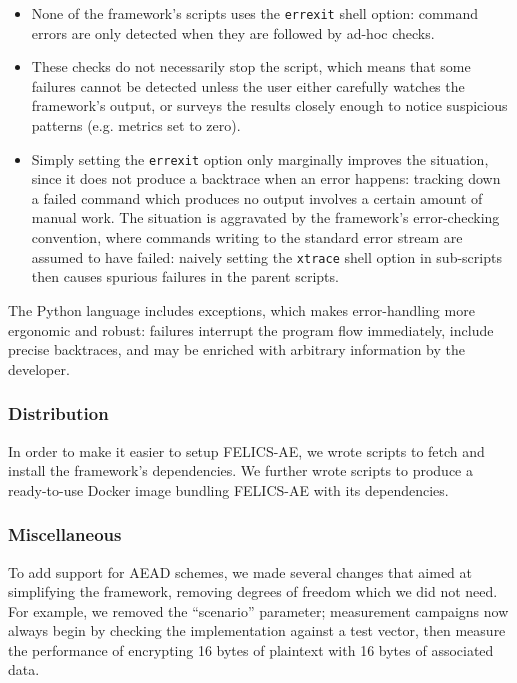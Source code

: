 \documentclass{article}
\begin{document}
\begin{itemize}
\item None of the framework's scripts uses the \texttt{errexit} shell
  option: command errors are only detected when they are followed by
  ad-hoc checks.
\item These checks do not necessarily stop the script, which means
  that some failures cannot be detected unless the user either
  carefully watches the framework's output, or surveys the results
  closely enough to notice suspicious patterns (e.g. metrics set to
  zero).
\item Simply setting the \texttt{errexit} option only marginally
  improves the situation, since it does not produce a backtrace when
  an error happens: tracking down a failed command which produces no
  output involves a certain amount of manual work.  The situation is
  aggravated by the framework's error-checking convention, where
  commands writing to the standard error stream are assumed to have
  failed: naively setting the \texttt{xtrace} shell option in
  sub-scripts then causes spurious failures in the parent scripts.
\end{itemize}

The Python language includes exceptions, which makes error-handling
more ergonomic and robust: failures interrupt the program flow
immediately, include precise backtraces, and may be enriched with
arbitrary information by the developer.

\subsubsection{Distribution}
\label{sec:felics-ae/distrib}

In order to make it easier to setup FELICS-AE, we wrote scripts to
fetch and install the framework's dependencies.  We further wrote
scripts to produce a ready-to-use Docker image bundling FELICS-AE with
its dependencies.

\subsubsection{Miscellaneous}
\label{sec:felics-ae/misc}

To add support for AEAD schemes, we made several changes that aimed at
simplifying the framework, removing degrees of freedom which we did
not need.  For example, we removed the ``scenario'' parameter;
measurement campaigns now always begin by checking the implementation
against a test vector, then measure the performance of encrypting 16
bytes of plaintext with 16 bytes of associated data.
\end{document}
